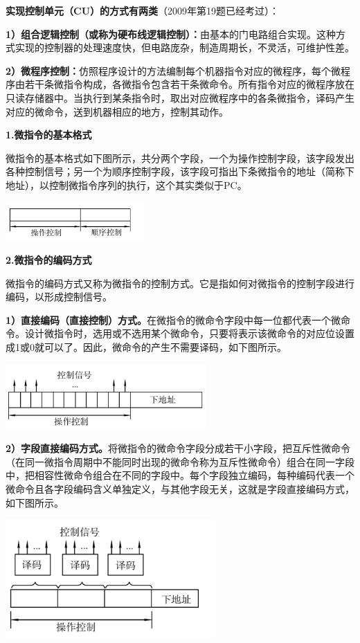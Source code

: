 {\textbf{实现控制单元（CU）的方式有两类}}（2009年第19题已经考过）：

\textbf{1）组合逻辑控制（或称为硬布线逻辑控制）：}由基本的门电路组合实现。这种方式实现的控制器的处理速度快，但电路庞杂，制造周期长，不灵活，可维护性差。

\textbf{2）微程序控制：}仿照程序设计的方法编制每个机器指令对应的微程序，每个微程序由若干条微指令构成，各微指令包含若干条微命令。所有指令对应的微程序放在只读存储器中。当执行到某条指令时，取出对应微程序中的各条微指令，译码产生对应的微命令，送到机器相应的地方，控制其动作。

{\textbf{1.微指令的基本格式}}

微指令的基本格式如下图所示，共分两个字段，一个为操作控制字段，该字段发出各种控制信号；另一个为顺序控制字段，该字段可指出下条微指令的地址（简称下地址），以控制微指令序列的执行，这个其实类似于PC。

\includegraphics[width=2.08333in,height=0.58333in]{png-jpeg-pics/D02093D34A87FA443383A3FA46BE796B.png}

{\textbf{2.微指令的编码方式}}

微指令的编码方式又称为微指令的控制方式。它是指如何对微指令的控制字段进行编码，以形成控制信号。

\textbf{1）直接编码（直接控制）方式。}在微指令的微命令字段中每一位都代表一个微命令。设计微指令时，选用或不选用某个微命令，只要将表示该微命令的对应位设置成1或0就可以了。因此，微命令的产生不需要译码，如下图所示。

\includegraphics[width=3.01042in,height=0.97917in]{png-jpeg-pics/38B2985EEE6550D6DC4F8E528D13FE8A.png}

\textbf{2）字段直接编码方式。}将微指令的微命令字段分成若干小字段，把互斥性微命令（在同一微指令周期中不能同时出现的微命令称为互斥性微命令）组合在同一字段中，把相容性微命令组合在不同的字段中。每个字段独立编码，每种编码代表一个微命令且各字段编码含义单独定义，与其他字段无关，这就是字段直接编码方式，如下图所示。

\includegraphics[width=3.11458in,height=1.78125in]{png-jpeg-pics/79B04EA02F4B63DE41B929D9BCDA782E.png}

